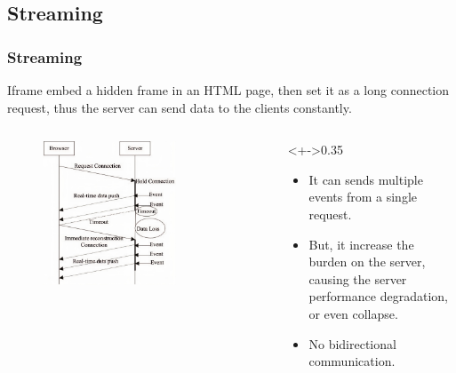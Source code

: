 \documentclass{beamer}
\begin{document}
\subsection{Streaming}
\begin{frame}
    \frametitle{Streaming}
    Iframe embed a hidden frame in an HTML page, then set it as a long connection request, thus the server can send data to the clients constantly.
    \begin{columns}
        \begin{column}{0.7\textwidth}
            \begin{figure}
                \includegraphics[width=0.7\textwidth]{images/streaming.jpeg}
            \end{figure}
        \end{column}
        \begin{column}<+->{0.35\textwidth}
            \begin{itemize}[<+->]
                \item It can sends {\color{green} multiple events} from a {\color{green} single
                              request}.
                \item But, it increase the \alert{burden on the server}, causing the server
                      \alert{performance degradation}, or even collapse. 
                \item \alert{No bidirectional communication.}
            \end{itemize}
        \end{column}
    \end{columns}
\end{frame}
\end{document}
